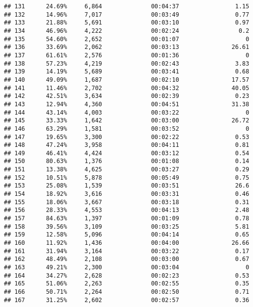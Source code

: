 \documentclass[
]{article}
\begin{document}
\begin{verbatim}
## 131      24.69%     6,864              00:04:37                1.15
## 132      14.96%     7,017              00:03:49                0.77
## 133      21.88%     5,691              00:03:10                0.97
## 134      46.96%     4,222              00:02:24                 0.2
## 135      54.60%     2,652              00:01:07                   0
## 136      33.69%     2,062              00:03:13               26.61
## 137      61.61%     2,576              00:01:36                   0
## 138      57.23%     4,219              00:02:43                3.83
## 139      14.19%     5,689              00:03:41                0.68
## 140      49.09%     1,687              00:02:10               17.57
## 141      11.46%     2,702              00:04:32               40.05
## 142      42.51%     3,634              00:02:39                0.23
## 143      12.94%     4,360              00:04:51               31.38
## 144      43.14%     4,003              00:03:22                   0
## 145      33.33%     1,642              00:03:00               26.72
## 146      63.29%     1,581              00:03:52                   0
## 147      19.65%     3,300              00:02:22                0.53
## 148      47.24%     3,958              00:04:11                0.81
## 149      46.41%     4,424              00:03:12                0.54
## 150      80.63%     1,376              00:01:08                0.14
## 151      13.38%     4,625              00:03:27                0.29
## 152      10.51%     5,878              00:05:49                0.75
## 153      25.08%     1,539              00:03:51                26.6
## 154      18.92%     3,616              00:03:31                0.46
## 155      18.06%     3,667              00:03:18                0.31
## 156      28.33%     4,553              00:04:13                2.48
## 157      84.63%     1,397              00:01:09                0.78
## 158      39.56%     3,109              00:03:25                5.81
## 159      12.58%     5,096              00:04:14                0.65
## 160      11.92%     1,436              00:04:00               26.66
## 161      31.94%     3,164              00:03:22                0.17
## 162      48.49%     2,108              00:03:00                0.67
## 163      49.21%     2,300              00:03:04                   0
## 164      34.27%     2,628              00:02:23                0.53
## 165      51.06%     2,263              00:02:55                0.35
## 166      50.71%     2,264              00:02:50                0.71
## 167      31.25%     2,602              00:02:57                0.36

\end{verbatim}
\end{document}
